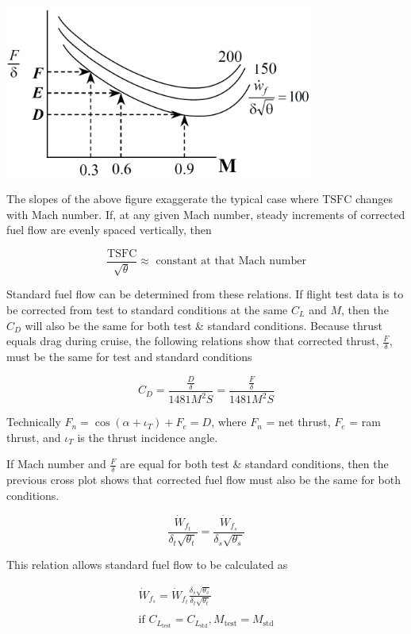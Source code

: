 \documentclass[
]{book}
\begin{document}
\includegraphics[width=4in,height=\textheight]{media/12/corr-thrust-m.png}

The slopes of the above figure exaggerate the typical case where
\(\mathrm{TSFC}\) changes with Mach number. If, at any given Mach number, steady
increments of corrected fuel flow are evenly spaced vertically, then

\[
\frac{\mathrm{TSFC}}{\sqrt{\theta}} \approx \text{ constant at that Mach number}
\]

Standard fuel flow can be determined from these relations. If flight test data
is to be corrected from test to standard conditions at the same \(C_L\) and
\(M\), then the \(C_D\) will also be the same for both test \& standard
conditions. Because thrust equals drag during cruise, the following relations
show that corrected thrust, \(\frac{F}{\delta}\), must be the same for test and standard conditions

\[
C_D = \frac{\frac{D}{\delta}}{1481 M^2 S} = \frac{\frac{F}{\delta}}{1481 M^2 S}
\]

Technically \(F_n = \cos \left( \alpha + \iota_T \right) + F_e = D\), where
\(F_n\) = net thrust, \(F_e\) = ram thrust, and \(\iota_T\) is the thrust
incidence angle.

If Mach number and \(\frac{F}{\delta}\) are equal for both test \& standard
conditions, then the previous cross plot shows that corrected fuel flow must
also be the same for both conditions.

\[
\frac{\dot{W}_{f_t}}{\delta_t \sqrt{\theta_t}} = \frac{\dot{W}_{f_s}}{\delta_s \sqrt{\theta_s}}
\]

This relation allows standard fuel flow to be calculated as

\begin{align}
\dot{W}_{f_s} = \dot{W}_{f_t} \frac{\delta_s \sqrt{\theta_s}}{\delta_t \sqrt{\theta_t}} \\
\\
\text{if } C_{L_{\text{test}}} = C_{L_{\text{std}}}, M_{\text{test}} = M_{\text{std}} \\
\label{eq:std-fuel-flow}
\end{align}
\end{document}
